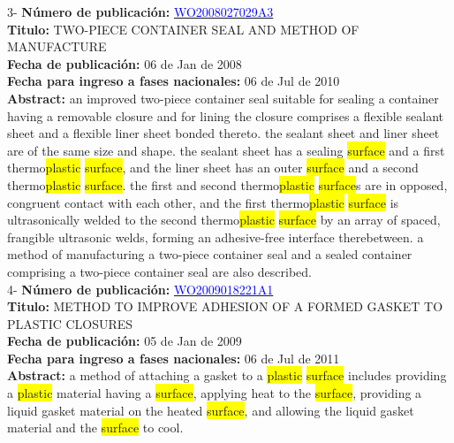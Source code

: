  \vspace{1cm}3- \textbf{Número de publicación:} \href{https://worldwide.espacenet.com/publicationDetails/biblio?DB=EPODOC&II=0&ND=3&adjacent=true&locale=en_EP&FT=D&date=20160331&CC=WO&NR=2008027029A3&KC=A3#}{\textcolor{blue}{WO2008027029A3}}\\ 
\textbf{Titulo:} TWO-PIECE CONTAINER SEAL AND METHOD OF MANUFACTURE\\ 
 
\textbf{Fecha de publicación:} 06 de Jan de 2008\\ 
\textbf{Fecha para ingreso a fases nacionales:} 06 de Jul de 2010\\ 
\textbf{Abstract:} an improved two-piece container seal suitable for sealing a container having a removable closure and for lining the closure comprises a flexible sealant sheet and a flexible liner sheet bonded thereto. the sealant sheet and liner sheet are of the same size and shape. the sealant sheet has a sealing \colorbox{yellow}{surface} and a first thermo\colorbox{yellow}{plastic} \colorbox{yellow}{surface}, and the liner sheet has an outer \colorbox{yellow}{surface} and a second thermo\colorbox{yellow}{plastic} \colorbox{yellow}{surface}. the first and second thermo\colorbox{yellow}{plastic} \colorbox{yellow}{surface}s are in opposed, congruent contact with each other, and the first thermo\colorbox{yellow}{plastic} \colorbox{yellow}{surface} is ultrasonically welded to the second thermo\colorbox{yellow}{plastic} \colorbox{yellow}{surface} by an array of spaced, frangible ultrasonic welds, forming an adhesive-free interface therebetween. a method of manufacturing a two-piece container seal and a sealed container comprising a two-piece container seal are also described.\\ 
 

 \vspace{1cm}4- \textbf{Número de publicación:} \href{https://worldwide.espacenet.com/publicationDetails/biblio?DB=EPODOC&II=0&ND=3&adjacent=true&locale=en_EP&FT=D&date=20160331&CC=WO&NR=2009018221A1&KC=A1#}{\textcolor{blue}{WO2009018221A1}}\\ 
\textbf{Titulo:} METHOD TO IMPROVE ADHESION OF A FORMED GASKET TO PLASTIC CLOSURES\\ 
 
\textbf{Fecha de publicación:} 05 de Jan de 2009\\ 
\textbf{Fecha para ingreso a fases nacionales:} 06 de Jul de 2011\\ 
\textbf{Abstract:} a method of attaching a gasket to a \colorbox{yellow}{plastic} \colorbox{yellow}{surface} includes providing a \colorbox{yellow}{plastic} material having a \colorbox{yellow}{surface}, applying heat to the \colorbox{yellow}{surface}, providing a liquid gasket material on the heated \colorbox{yellow}{surface}, and allowing the liquid gasket material and the \colorbox{yellow}{surface} to cool.\\ 
 


